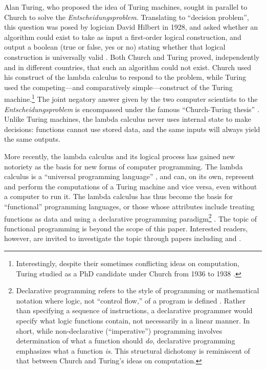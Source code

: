 \documentclass[twocolumn,titlepage,12pt]{article}
\begin{document}
Alan Turing, who proposed the idea of Turing machines, sought in parallel to Church to solve the \textit{Entscheidungsproblem}. Translating to ``decision problem'', this question was posed by logician David Hilbert in 1928, and asked whether an algorithm could exist to take as input a first-order logical construction, and output a boolean (true or false, yes or no) stating whether that logical construction is universally valid \cite{hilbert}. Both Church and Turing proved, independently and in different countries, that such an algorithm could not exist. Church used his construct of the lambda calculus to respond to the problem, while Turing used the competing---and comparatively simple---construct of the Turing machine.\footnote{Interestingly, despite their sometimes conflicting ideas on computation, Turing studied as a PhD candidate under Church from 1936 to 1938 \cite{churchpapers}.} The joint negatory answer given by the two computer scientists to the \textit{Entscheidungsproblem} is encompassed under the famous ``Church-Turing thesis'' \cite{churchturingthesis}. Unlike Turing machines, the lambda calculus never uses internal state to make decisions: functions cannot use stored data, and the same inputs will always yield the same outputs.

More recently, the lambda calculus and its logical process has gained new notoriety as the basis for new forms of computer programming. The lambda calculus is a ``universal programming language'' \cite{rojastutorial}, and can, on its own, represent and perform the computations of a Turing machine and vice versa, even without a computer to run it. The lambda calculus has thus become the basis for ``functional'' programming languages, or those whose attributes include treating functions as data and using a declarative programming paradigm\footnote{Declarative programming refers to the style of programming or mathematical notation where logic, not ``control flow,'' of a program is defined \cite{declarativeprogadv}. Rather than specifying a sequence of instructions, a declarative programmer would specify what logic functions contain, not necessarily in a linear manner. In short, while non-declarative (``imperative'') programming involves determination of what a function should \textit{do}, declarative programming emphasizes what a function \textit{is}. This structural dichotomy is reminiscent of that between Church and Turing's ideas on computation.} \cite{hudakevolution}. The topic of functional programming is beyond the scope of this paper. Interested readers, however, are invited to investigate the topic through papers including \cite{totalfp} and \cite{hudakevolution}.
\end{document}
